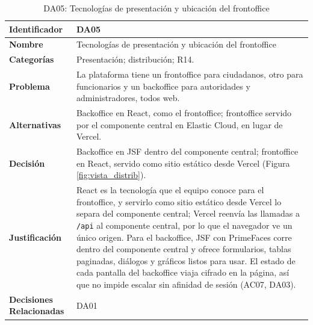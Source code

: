 \begin{table}[H]
    \small
    \centering
    \caption{DA05: Tecnologías de presentación y ubicación del frontoffice}
    \label{tab:da05}
    \begin{tabular}{|p{4.1cm}|p{11.7cm}|}
        \hline
            \textbf{Identificador} & DA05 \\
        \hline
            \textbf{Nombre} & Tecnologías de presentación y ubicación del frontoffice \\
        \hline
            \textbf{Categorías} & Presentación; distribución; R14. \\
        \hline
            \textbf{Problema} & La plataforma tiene un frontoffice para ciudadanos, otro para funcionarios y un backoffice para autoridades y administradores, todos web. \\
        \hline
            \textbf{Alternativas} & Backoffice en React, como el frontoffice; frontoffice servido por el componente central en Elastic Cloud, en lugar de Vercel. \\
        \hline
            \textbf{Decisión} & Backoffice en JSF dentro del componente central; frontoffice en React, servido como sitio estático desde Vercel (Figura \ref{fig:vista_distrib}). \\
        \hline
            \textbf{Justificación} & React es la tecnología que el equipo conoce para el frontoffice, y servirlo como sitio estático desde Vercel lo separa del componente central; Vercel reenvía las llamadas a \texttt{/api} al componente central, por lo que el navegador ve un único origen. Para el backoffice, JSF con PrimeFaces corre dentro del componente central y ofrece formularios, tablas paginadas, diálogos y gráficos listos para usar. El estado de cada pantalla del backoffice viaja cifrado en la página, así que no impide escalar sin afinidad de sesión (AC07, DA03). \\
        \hline
            \textbf{Decisiones Relacionadas} & DA01 \\
        \hline
    \end{tabular}
\end{table}


